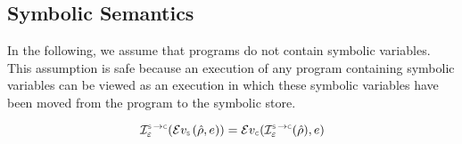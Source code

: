 \subsection{Symbolic Semantics}

In the following, we assume that \jsil programs do not contain symbolic variables. This assumption is safe because an execution of any \jsil program containing symbolic variables can be viewed as an execution in which these symbolic variables have been moved from the program to the symbolic store.

\begin{lemma}\label{symb:eval:expr}
$$
\interpret{\symbconc}{\senv}(\evalexpr{\symbolic}(\sstore, \jsilexpr)) = \evalexpr{\concrete}(\interpret{\symbconc}{\senv}(\sstore), \jsilexpr)
$$
\end{lemma}
